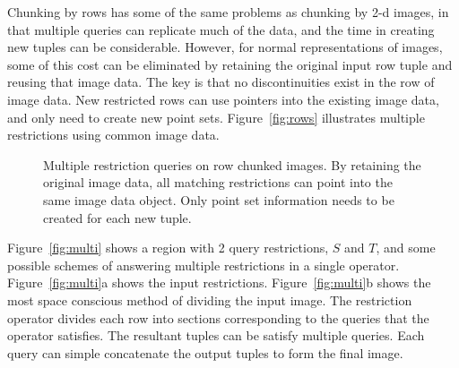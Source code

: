 \documentclass{vldb}
\begin{document}
Chunking by rows has some of the same problems as chunking by 2-d
images, in that multiple queries can replicate much of the data, and
the time in creating new tuples can be considerable.  However, for
normal representations of images, some of this cost can be eliminated
by retaining the original input row tuple and reusing that image data.
The key is that no discontinuities exist in the row of image data.
New restricted rows can use pointers into the existing image data, and
only need to create new point sets.  Figure~\ref{fig:rows} illustrates
multiple restrictions using common image data.

\begin{figure}[htbp]
  \centering
\quad
 \caption{%
   Multiple restriction queries on row chunked images.  By retaining
   the original image data, all matching restrictions can point into
   the same image data object.  Only point set information needs to be
   created for each new tuple.}
 \label{fig:chunk}
\end{figure}

Figure~\ref{fig:multi} shows a region with 2 query restrictions, $S$
and $T$, and some possible schemes of answering multiple restrictions
in a single operator.  Figure~\ref{fig:multi}a shows the input
restrictions.  Figure~\ref{fig:multi}b shows the most space conscious
method of dividing the input image.  The restriction operator divides
each row into sections corresponding to the queries that the operator
satisfies.  The resultant tuples can be satisfy multiple queries.
Each query can simple concatenate the output tuples to form the final
image.
\end{document}
